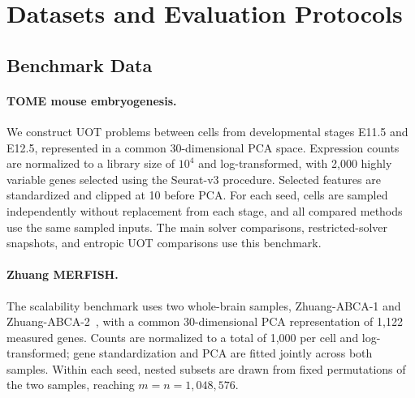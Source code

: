\section{Datasets and Evaluation Protocols}
\label{app:extension-experiment-protocols}

\subsection{Benchmark Data}
\label{app:benchmark-data}

\paragraph{TOME mouse embryogenesis.}
We construct UOT problems between cells from developmental stages E11.5 and E12.5, represented in a common 30-dimensional PCA space.
Expression counts are normalized to a library size of $10^4$ and log-transformed, with 2,000 highly variable genes selected using the Seurat-v3 procedure.
Selected features are standardized and clipped at 10 before PCA.
For each seed, cells are sampled independently without replacement from each stage, and all compared methods use the same sampled inputs.
The main solver comparisons, restricted-solver snapshots, and entropic UOT comparisons use this benchmark.

\paragraph{Zhuang MERFISH.}
The scalability benchmark uses two whole-brain samples, Zhuang-ABCA-1 and Zhuang-ABCA-2~\citep{zhang2023wholebrainmerfish}, with a common 30-dimensional PCA representation of 1,122 measured genes.
Counts are normalized to a total of 1,000 per cell and log-transformed; gene standardization and PCA are fitted jointly across both samples.
Within each seed, nested subsets are drawn from fixed permutations of the two samples, reaching $m=n=1{,}048{,}576$.

